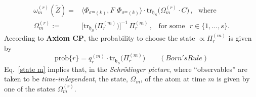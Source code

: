 \documentclass[12pt]{article}
\begin{document}
\begin{align}\label{state m}
\omega_{m}^{(r)}(\tilde{Z})=&  \langle \Phi_{\sigma^{m}({k})}, F\,\, \Phi_{\sigma^{m}({k})} \rangle \cdot
\text{tr}_{\mathfrak{h}_S}\big(\Omega_{m}^{(r)} \cdot C\big)\,,\,\,\text{ where }\nonumber \\
\Omega_{m}^{(r)}:=&\big[\text{tr}_{\mathfrak{h}_S}\big(\Pi_{r}^{(m)}\big)\big]^{-1}\, \Pi_{r}^{(m)}\,, \,\,\, \text{ for some }\,\,
r \in \big\{1, \dots, s\big\} .
\end{align}
According to {\bf{Axiom CP}}, the probability to choose the state $\propto \Pi_{r}^{(m)}$ is given by
$$\text{prob}\{r\}= q_{r}^{(m)} \cdot \text{tr}_{\mathfrak{h}_S}\big(\Pi_{r}^{(m)}\big)\qquad (Born's Rule)$$
Eq.~\eqref{state m} implies that, in the \textit{Schr\"odinger picture}, where ``observables'' are taken to
be \textit{time-independent}, the state, $\Omega_m$, of the atom at time $m$ is given by one of the states
$\Omega_{m}^{(r)}$.
\end{document}
